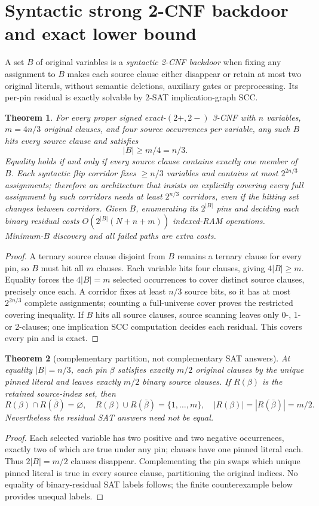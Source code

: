 \documentclass[10pt]{article}
\newtheorem{theorem}{Theorem}
\begin{document}
\section{Syntactic strong 2-CNF backdoor and exact lower bound}
A set $B$ of original variables is a \emph{syntactic 2-CNF backdoor} when fixing any assignment to $B$ makes each source clause either disappear or retain at most two original literals, without semantic deletions, auxiliary gates or preprocessing. Its per-pin residual is exactly solvable by 2-SAT implication-graph SCC.
\begin{theorem}
For every proper signed exact-$(2+,2-)$ 3-CNF with $n$ variables, $m=4n/3$ original clauses, and four source occurrences per variable, any such $B$ hits every source clause and satisfies
\[
 |B|\ge m/4=n/3.
\]
Equality holds if and only if every source clause contains exactly one member of $B$. Each syntactic flip corridor fixes $\ge n/3$ variables and contains at most $2^{2n/3}$ assignments; therefore an architecture that insists on explicitly covering \emph{every full assignment} by such corridors needs at least $2^{n/3}$ corridors, even if the hitting set changes between corridors. Given $B$, enumerating its $2^{|B|}$ pins and deciding each binary residual costs $O(2^{|B|}(N+n+m))$ indexed-RAM operations. Minimum-$B$ discovery and all failed paths are extra costs.
\end{theorem}
\begin{proof}
A ternary source clause disjoint from $B$ remains a ternary clause for every pin, so $B$ must hit all $m$ clauses. Each variable hits four clauses, giving $4|B|\ge m$. Equality forces the $4|B|=m$ selected occurrences to cover distinct source clauses, precisely once each. A corridor fixes at least $n/3$ source bits, so it has at most $2^{2n/3}$ complete assignments; counting a full-universe cover proves the restricted covering inequality. If $B$ hits all source clauses, source scanning leaves only 0-, 1- or 2-clauses; one implication SCC computation decides each residual. This covers every pin and is exact. \end{proof}
\begin{theorem}[complementary partition, not complementary SAT answers]
At equality $|B|=n/3$, each pin $\beta$ satisfies exactly $m/2$ original clauses by the unique pinned literal and leaves exactly $m/2$ binary source clauses. If $R(\beta)$ is the retained source-index set, then
\[
 R(\beta)\cap R(\bar\beta)=\varnothing,\quad
 R(\beta)\cup R(\bar\beta)=\{1,\ldots,m\},\quad
 |R(\beta)|=|R(\bar\beta)|=m/2.
\]
Nevertheless the residual SAT answers need not be equal.
\end{theorem}
\begin{proof}
Each selected variable has two positive and two negative occurrences, exactly two of which are true under any pin; clauses have one pinned literal each. Thus $2|B|=m/2$ clauses disappear. Complementing the pin swaps which unique pinned literal is true in every source clause, partitioning the original indices. No equality of binary-residual SAT labels follows; the finite counterexample below provides unequal labels. \end{proof}
\end{document}
